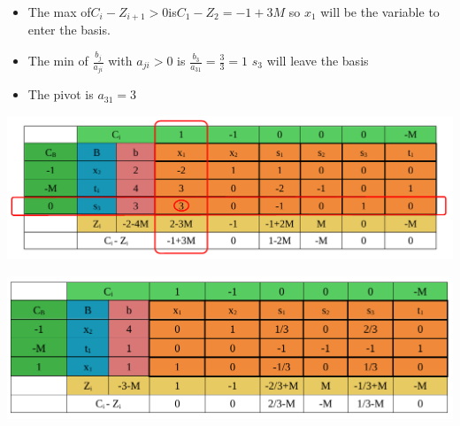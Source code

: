 \vspace{0.25cm}
\begin{itemize}   
    \item The max of\hspace{0.2cm}\(C_i - Z_{i+1} > 0\)\hspace{0.2cm}is\hspace{0.2cm}\(C_1 - Z_2 = -1+3M\)\hspace{0.1cm} so \(x_1\) 
will be the variable to enter the basis.
\item The min of \hspace{0.1cm}\(\frac{b_j}{a_{ji}}\)\hspace{0.1cm} with \(a_{ji} > 0\)\hspace{0.1cm} is \hspace{0.1cm} \(\frac{b_3}{a_{31}} = \frac{3}{3} = 1\)\hspace{0.35cm} \(s_3\)
will leave the basis
\item The pivot is \(a_{31} = 3\)
 
\end{itemize}


\vspace{0.25cm}

\begin{center}
    \includegraphics{Chapters/Simplexe/EX/EX5/ex5.4.pdf}
\end{center}

\newpage

\begin{center}
    \includegraphics{Chapters/Simplexe/EX/EX5/ex5.5.pdf}
\end{center}

\vspace{0.25cm}


